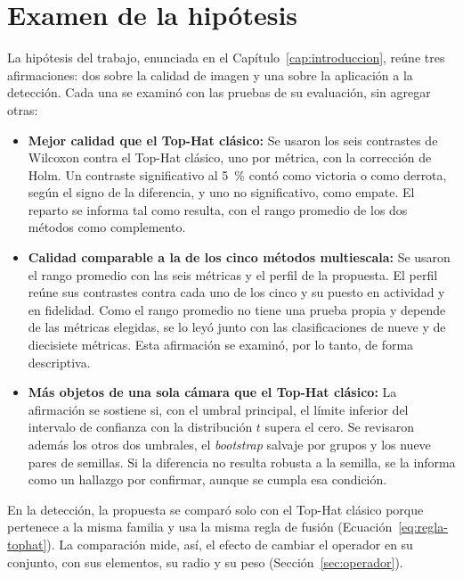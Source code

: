 \section{Examen de la hipótesis}
\label{sec:examen-hipotesis}

La hipótesis del trabajo, enunciada en el Capítulo~\ref{cap:introduccion}, reúne tres afirmaciones: dos
sobre la calidad de imagen y una sobre la aplicación a la detección. Cada una se examinó con las pruebas
de su evaluación, sin agregar otras:
\begin{itemize}
\item \textbf{Mejor calidad que el Top-Hat clásico:} Se usaron los seis contrastes de Wilcoxon contra
el Top-Hat clásico, uno por métrica, con la corrección de Holm. Un contraste significativo al 5~\%
contó como victoria o como derrota, según el signo de la diferencia, y uno no significativo, como
empate. El reparto se informa tal como resulta, con el rango promedio de los dos métodos como
complemento.
\item \textbf{Calidad comparable a la de los cinco métodos multiescala:} Se usaron el rango promedio con
las seis métricas y el perfil de la propuesta. El perfil reúne sus contrastes contra cada uno de los
cinco y su puesto en actividad y en fidelidad. Como el rango promedio no tiene una prueba propia y
depende de las métricas elegidas, se lo leyó junto con las clasificaciones de nueve y de diecisiete
métricas. Esta afirmación se examinó, por lo tanto, de forma descriptiva.
\item \textbf{Más objetos de una sola cámara que el Top-Hat clásico:} La afirmación se sostiene si, con
el umbral principal, el límite inferior del intervalo de confianza con la distribución $t$ supera el
cero. Se revisaron además los otros dos umbrales, el \textit{bootstrap} salvaje por grupos y los nueve
pares de semillas. Si la diferencia no resulta robusta a la semilla, se la informa como un hallazgo por
confirmar, aunque se cumpla esa condición.
\end{itemize}

En la detección, la propuesta se comparó solo con el Top-Hat clásico porque pertenece a la misma
familia y usa la misma regla de fusión (Ecuación~\ref{eq:regla-tophat}). La comparación mide, así, el
efecto de cambiar el operador en su conjunto, con sus elementos, su radio y su peso
(Sección~\ref{sec:operador}).
